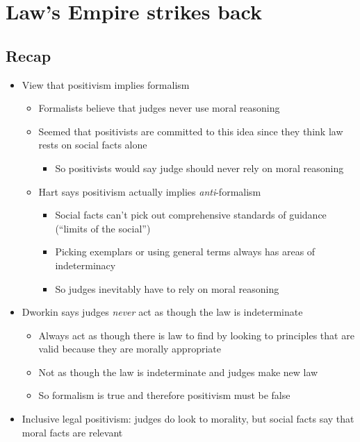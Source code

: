 \hypertarget{laws-empire-strikes-back}{%
\section{Law's Empire strikes back}\label{laws-empire-strikes-back}}

\hypertarget{recap}{%
\subsection{Recap}\label{recap}}

\begin{itemize}
\tightlist
\item
  View that positivism implies formalism

  \begin{itemize}
  \tightlist
  \item
    Formalists believe that judges never use moral reasoning
  \item
    Seemed that positivists are committed to this idea since they think
    law rests on social facts alone

    \begin{itemize}
    \tightlist
    \item
      So positivists would say judge should never rely on moral
      reasoning
    \end{itemize}
  \item
    Hart says positivism actually implies \emph{anti}-formalism

    \begin{itemize}
    \tightlist
    \item
      Social facts can't pick out comprehensive standards of guidance
      (``limits of the social'')
    \item
      Picking exemplars or using general terms always has areas of
      indeterminacy
    \item
      So judges inevitably have to rely on moral reasoning
    \end{itemize}
  \end{itemize}
\item
  Dworkin says judges \emph{never} act as though the law is
  indeterminate

  \begin{itemize}
  \tightlist
  \item
    Always act as though there is law to find by looking to principles
    that are valid because they are morally appropriate
  \item
    Not as though the law is indeterminate and judges make new law
  \item
    So formalism is true and therefore positivism must be false
  \end{itemize}
\item
  Inclusive legal positivism: judges do look to morality, but social
  facts say that moral facts are relevant


\end{itemize}
